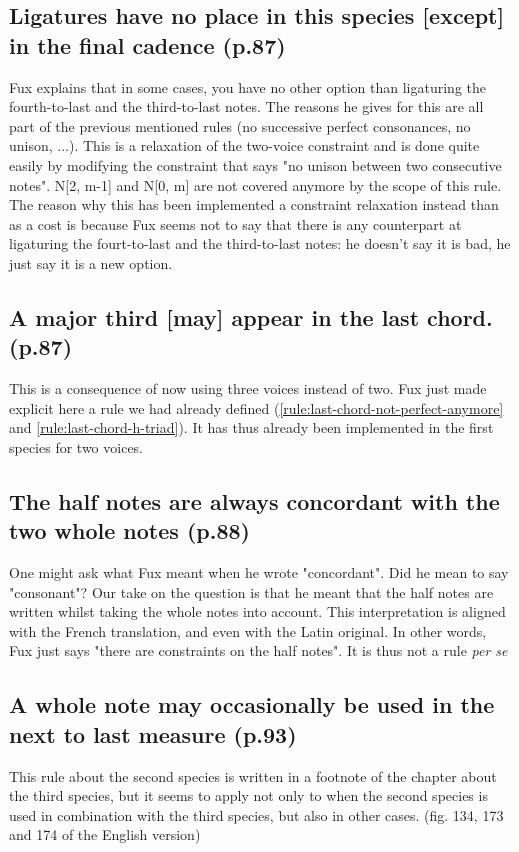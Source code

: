 \subsection{Ligatures have no place in this species [except] in the final cadence (p.87)}
Fux explains that in some cases, you have no other option than ligaturing the fourth-to-last and the third-to-last notes. The reasons he gives for this are all part of the previous mentioned rules (no successive perfect consonances, no unison, ...).
This is a relaxation of the two-voice constraint and is done quite easily by modifying the constraint that says "no unison between two consecutive notes". N[2, m-1] and N[0, m] are  not covered anymore by the scope of this rule. The reason why this has been implemented a constraint relaxation instead than as a cost is because Fux seems not to say that there is any counterpart at ligaturing the fourt-to-last and the third-to-last notes: he doesn't say it is bad, he just say it is a new option.

\subsection{A major third [may] appear in the last chord. (p.87)}
This is a consequence of now using three voices instead of two. Fux just made explicit here a rule we had already defined (\ref{rule:last-chord-not-perfect-anymore} and \ref{rule:last-chord-h-triad}). It has thus already been implemented in the first species for two voices.

\subsection{The half notes are always concordant with the two whole notes (p.88)}
One might ask what Fux meant when he wrote "concordant". Did he mean to say "consonant"? Our take on the question is that he meant that the half notes are written whilst taking the whole notes into account. This interpretation is aligned with the French translation, and even with the Latin original. In other words, Fux just says "there are constraints on the half notes". It is thus not a rule \textit{per se}

\subsection{A whole note may occasionally be used in the next to last measure (p.93)}
This rule about the second species is written in a footnote of the chapter about the third species, but it seems to apply not only to when the second species is used in combination with the third species, but also in other cases. (fig. 134, 173 and 174 of the English version)


